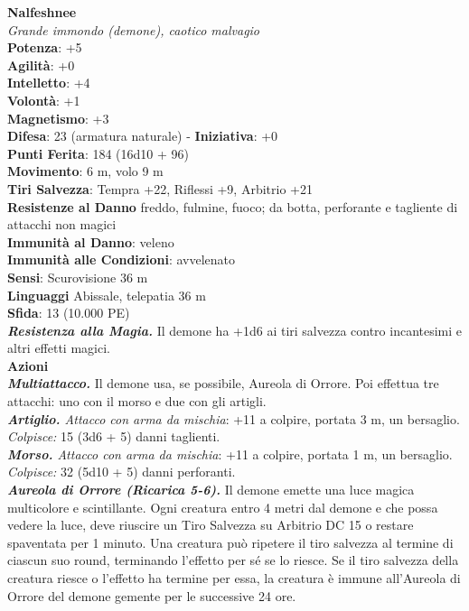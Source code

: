 \begin{multicols}{2}
\medskip\textbf{Nalfeshnee}\\
\emph{Grande immondo (demone), caotico malvagio}\\
\textbf{Potenza}: +5\\
\textbf{Agilità}: +0\\
\textbf{Intelletto}: +4\\
\textbf{Volontà}: +1\\
\textbf{Magnetismo}: +3\\
\textbf{Difesa}: 23 (armatura naturale) - \textbf{Iniziativa}: +0\\
\textbf{Punti Ferita}: 184 (16d10 + 96)\\
\textbf{Movimento}: 6 m, volo 9 m\\
\textbf{Tiri Salvezza}: Tempra +22, Riflessi +9, Arbitrio +21\\
\textbf{Resistenze al Danno} freddo, fulmine, fuoco; da botta, perforante e tagliente di attacchi non magici\\
\textbf{Immunità al Danno}: veleno\\
\textbf{Immunità alle Condizioni}: avvelenato\\
\textbf{Sensi}: Scurovisione 36 m\\
\textbf{Linguaggi} Abissale, telepatia 36 m \\
\textbf{Sfida}: 13 (10.000 PE)\smallskip\\
\emph{\textbf{Resistenza alla Magia.}} Il demone ha +1d6 ai tiri salvezza contro incantesimi e altri effetti magici.\\
\smallskip\textbf{Azioni}\\
\emph{\textbf{Multiattacco.}} Il demone usa, se possibile, Aureola di Orrore. Poi effettua tre attacchi: uno con il morso e due con gli artigli.\\
\emph{\textbf{Artiglio.} Attacco con arma da mischia}: +11 a colpire, portata 3 m, un bersaglio.\\
\emph{Colpisce:} 15 (3d6 + 5) danni taglienti.\\
\emph{\textbf{Morso.} Attacco con arma da mischia}: +11 a colpire, portata 1 m, un bersaglio.\\
\emph{Colpisce:} 32 (5d10 + 5) danni perforanti.\\
\emph{\textbf{Aureola di Orrore (Ricarica 5-6).}} Il demone emette una luce magica multicolore e scintillante. Ogni creatura entro 4 metri dal demone e che possa vedere la luce, deve riuscire un Tiro Salvezza su Arbitrio DC 15 o restare spaventata per 1 minuto. Una creatura può ripetere il tiro salvezza al termine di ciascun suo round, terminando l'effetto per sé se lo riesce. Se il tiro salvezza della creatura riesce o l'effetto ha termine per essa, la creatura è immune all'Aureola di Orrore del demone gemente per le successive 24 ore.\\

\end{multicols}
